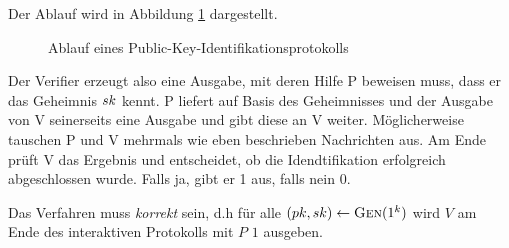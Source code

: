 Der Ablauf wird in Abbildung \ref{fig:pki-identifikation} dargestellt.  

\begin{figure}[h]
\begin{center}
  \caption{Ablauf eines Public-Key-Identifikationsprotokolls}
  \label{fig:pki-identifikation}
\end{center}
\end{figure}


Der Verifier erzeugt also eine Ausgabe, mit deren Hilfe
P beweisen muss, dass er das Geheimnis $sk$ kennt. P liefert auf Basis
des Geheimnisses und der Ausgabe von V seinerseits eine Ausgabe und gibt
diese an V weiter. Möglicherweise tauschen P und V mehrmals wie eben
beschrieben Nachrichten aus. Am Ende prüft V das Ergebnis und
entscheidet, ob die Idendtifikation erfolgreich abgeschlossen wurde. Falls ja,
gibt er 1 aus, falls nein 0. 

Das Verfahren muss \emph{korrekt} sein, d.h für alle $(pk, sk)
\leftarrow \textsc{Gen}(1^k)$ wird $V$ am Ende des interaktiven Protokolls mit
$P$ $1$ ausgeben. 

